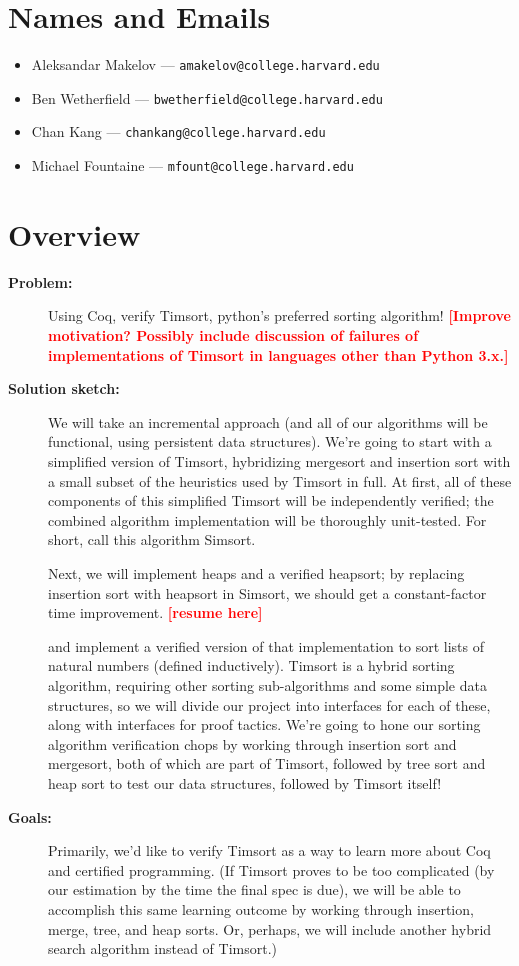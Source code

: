 \documentclass{article}
\newcommand{\todo}[1]{\textcolor{red}{\textbf{\textsf{[#1]}}}}
\begin{document}
\section{Names and Emails}
\begin{itemize}
  \item Aleksandar Makelov --- \texttt{amakelov@college.harvard.edu}
  \item Ben Wetherfield --- \texttt{bwetherfield@college.harvard.edu}
  \item Chan Kang --- \texttt{chankang@college.harvard.edu}
  \item Michael Fountaine --- \texttt{mfount@college.harvard.edu}
\end{itemize}


\section{Overview}
\begin{description}
  \item[\textbf{Problem:}]
    Using Coq, verify Timsort, python's preferred sorting algorithm!
    \todo{Improve motivation? Possibly include discussion of failures of
    implementations of Timsort in languages other than Python 3.x.}
  \item[\textbf{Solution sketch:}]
    We will take an incremental approach (and all of our algorithms
    will be functional, using persistent data structures).
    We're going to start with a
    simplified version of Timsort,
    hybridizing mergesort and insertion sort
    with a small subset of the heuristics used by Timsort in full.
    At first, all of these components of this simplified Timsort will
    be independently verified; the combined algorithm implementation
    will be thoroughly unit-tested.
    For short, call this algorithm Simsort.

    Next, we will implement heaps and a verified heapsort;
    by replacing insertion sort with heapsort in Simsort,
    we should get a constant-factor time improvement.
    \todo{resume here}

    and implement a verified version of that implementation to sort
    lists of natural numbers (defined inductively).
    Timsort is a hybrid sorting
    algorithm, requiring other sorting sub-algorithms and some simple data
    structures, so we will divide our project into interfaces for each of
    these, along with interfaces for proof tactics.
    We're going to hone our sorting algorithm verification chops
    by working through insertion sort and mergesort, both of which
    are part of Timsort, followed by tree sort and heap sort
    to test our data structures, followed by Timsort itself!
  \item[\textbf{Goals:}]
    Primarily, we'd like to verify Timsort as a way to learn more about
    Coq and certified programming. (If Timsort proves to be too
    complicated (by our estimation by the time the final spec is due),
    we will be able to accomplish this same learning outcome by working
    through insertion, merge, tree, and heap sorts. Or, perhaps, we will
    include another hybrid search algorithm instead of Timsort.)
\end{description}
\end{document}
